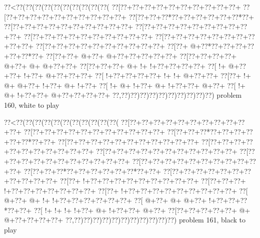 \vbox{\vbox{\goo
\0??<\0??(\0??(\0??(\0??(\0??(\0??(\0??(\0??(\0??(\0??(
\0??[\0??+\0??+\0??+\0??+\0??+\0??+\0??+\0??+\0??+\0??+
\0??[\0??+\0??+\0??+\0??+\0??+\0??+\0??+\0??+\0??+\0??+
\0??[\0??+\0??+\0??*\0??+\0??+\0??+\0??+\0??+\0??*\0??+
\0??[\0??+\0??+\0??+\0??+\0??+\0??+\0??+\0??+\0??+\0??+
\0??[\0??+\0??+\0??+\0??+\0??+\0??+\0??+\0??+\0??+\0??+
\0??[\0??+\0??+\0??+\0??+\0??+\0??+\0??+\0??+\0??+\0??+
\0??[\0??+\0??+\0??+\0??+\0??+\0??+\0??+\0??+\0??+\0??+
\0??[\0??+\0??+\0??+\0??+\0??+\0??+\0??+\0??+\0??+\0??+
\0??[\0??+\- @+\0??*\0??+\0??+\0??+\0??+\0??+\0??*\0??+
\0??[\0??+\0??+\- @+\0??+\- @+\0??+\0??+\0??+\0??+\0??+
\0??[\0??+\0??+\0??+\0??+\- @+\0??+\- @+\- @+\0??+\0??+
\0??[\0??+\0??+\0??+\- @+\- !+\- !+\0??+\0??+\0??+\0??+
\0??[\- !+\- @+\0??+\0??+\- !+\0??+\- @+\0??+\0??+\0??+
\0??[\- !+\0??+\0??+\0??+\0??+\- !+\- !+\- @+\0??+\0??+
\0??[\0??+\- !+\- @+\- @+\0??+\- !+\0??+\- @+\- !+\0??+
\0??[\- !+\- @+\- !+\0??+\- @+\- !+\0??+\0??+\- @+\0??+
\0??[\- !+\- @+\- !+\0??+\0??+\- @+\0??+\0??+\0??+\0??+
\0??,\0??)\0??)\0??)\0??)\0??)\0??)\0??)\0??)\0??)\0??)
}
\hfil problem 160, white to play\hfil\break
}

\vbox{\vbox{\goo
\0??<\0??(\0??(\0??(\0??(\0??(\0??(\0??(\0??(\0??(\0??(\0??(
\0??[\0??+\0??+\0??+\0??+\0??+\0??+\0??+\0??+\0??+\0??+\0??+
\0??[\0??+\0??+\0??+\0??+\0??+\0??+\0??+\0??+\0??+\0??+\0??+
\0??[\0??+\0??+\0??*\0??+\0??+\0??+\0??+\0??+\0??*\0??+\0??+
\0??[\0??+\0??+\0??+\0??+\0??+\0??+\0??+\0??+\0??+\0??+\0??+
\0??[\0??+\0??+\0??+\0??+\0??+\0??+\0??+\0??+\0??+\0??+\0??+
\0??[\0??+\0??+\0??+\0??+\0??+\0??+\0??+\0??+\0??+\0??+\0??+
\0??[\0??+\0??+\0??+\0??+\0??+\0??+\0??+\0??+\0??+\0??+\0??+
\0??[\0??+\0??+\0??+\0??+\0??+\0??+\0??+\0??+\0??+\0??+\0??+
\0??[\0??+\0??+\0??*\0??+\0??+\0??+\0??+\0??+\0??*\0??+\0??+
\0??[\0??+\0??+\0??+\0??+\0??+\0??+\0??+\0??+\0??+\0??+\0??+
\0??[\0??+\- !+\0??+\0??+\0??+\0??+\0??+\0??+\0??+\0??+\0??+
\0??[\0??+\0??+\0??+\- !+\0??+\0??+\0??+\0??+\0??+\0??+\0??+
\0??[\0??+\- !+\0??+\0??+\0??+\0??+\0??+\0??+\0??+\0??+\0??+
\0??[\- @+\0??+\- @+\- !+\- !+\0??+\0??+\0??+\0??+\0??+\0??+
\0??[\- @+\0??+\- @+\- @+\0??+\- !+\0??+\0??+\0??*\0??+\0??+
\0??[\- !+\- !+\- !+\- !+\0??+\- @+\- !+\0??+\0??+\- @+\0??+
\0??[\0??+\0??+\0??+\0??+\0??+\- @+\- @+\0??+\0??+\0??+\0??+
\0??,\0??)\0??)\0??)\0??)\0??)\0??)\0??)\0??)\0??)\0??)\0??)
}
\hfil problem 161, black to play\hfil\break
}

